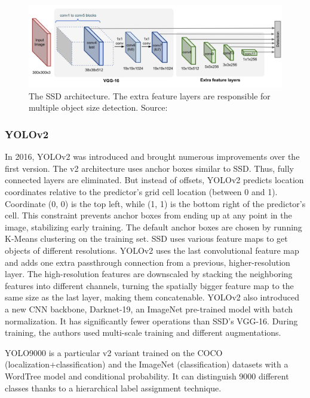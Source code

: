 \begin{figure}[htb]
 \centerline{\includegraphics[width=1.0\columnwidth]{.//Figure/Detector/SSD.png}}
 \caption{The SSD architecture. The extra feature layers are responsible for multiple object size detection. Source: \cite{ObjDetArchitectures4}}
 \label{fig:SSD}
\end{figure}

\subsubsection{YOLOv2}

In 2016, YOLOv2\cite{YOLOv2} was introduced and brought numerous improvements over the first version. The v2 architecture uses anchor boxes similar to SSD. Thus, fully connected layers are eliminated. But instead of offsets, YOLOv2 predicts location coordinates relative to the predictor's grid cell location (between 0 and 1). Coordinate (0, 0) is the top left, while (1, 1) is the bottom right of the predictor's cell. This constraint prevents anchor boxes from ending up at any point in the image, stabilizing early training. The default anchor boxes are chosen by running K-Means clustering on the training set. SSD uses various feature maps to get objects of different resolutions. YOLOv2 uses the last convolutional feature map and adds one extra passthrough connection from a previous, higher-resolution layer. The high-resolution features are downscaled by stacking the neighboring features into different channels, turning the spatially bigger feature map to the same size as the last layer, making them concatenable. YOLOv2 also introduced a new CNN backbone, Darknet-19, an ImageNet pre-trained model with batch normalization. It has significantly fewer operations than SSD's VGG-16. During training, the authors used multi-scale training and different augmentations. 

YOLO9000 is a particular v2 variant trained on the COCO (localization+classification) and the ImageNet (classification) datasets with a WordTree model and conditional probability. It can distinguish 9000 different classes thanks to a hierarchical label assignment technique.

